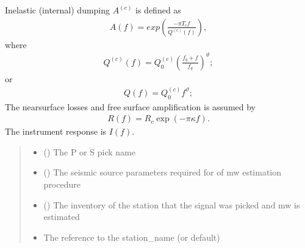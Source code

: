 \documentclass[letterpaper,10pt,english]{sphinxmanual}
\begin{document}
\begin{fulllineitems}
\sphinxAtStartPar
Inelastic (internal) dumping \(A^{\left(c\right)}\) is defined as
\begin{equation*}
\begin{split}A\left(f\right)=exp\left(\frac{-\pi T_cf}{Q^{\left(c\right)}\left(f\right)}\right),\end{split}
\end{equation*}
\sphinxAtStartPar
where
\begin{equation*}
\begin{split}Q^{\left(c\right)}\left(f\right)=Q_0^{\left(c\right)}\left(\frac{f_q+f}{f_q}\right)^\vartheta;\end{split}
\end{equation*}
\sphinxAtStartPar
or
\begin{equation*}
\begin{split}Q\left(f\right)=Q_0^{\left(c\right)}f^\vartheta;\end{split}
\end{equation*}
\sphinxAtStartPar
The near\sphinxhyphen{}surface losses and free surface amplification is assumed by
\begin{equation*}
\begin{split}R\left(f\right)=R_c\exp\left(-\pi \kappa f\right).\end{split}
\end{equation*}
\sphinxAtStartPar
The instrument response is \(I\left(f\right)\).
\begin{quote}\begin{description}
\begin{itemize}
\item {} 
\sphinxAtStartPar
{} () \textendash{} The P or S pick name

\item {} 
\sphinxAtStartPar
{} () \textendash{} The seismic source parameters required for of mw estimation procedure

\item {} 
\sphinxAtStartPar
{} () \textendash{} The inventory of the station that the signal was picked and mw is estimated

\item {} 
\sphinxAtStartPar
{} \textendash{} The reference to the station\_name (or default)


\end{itemize}
\end{description}
\end{quote}
\end{fulllineitems}
\end{document}
